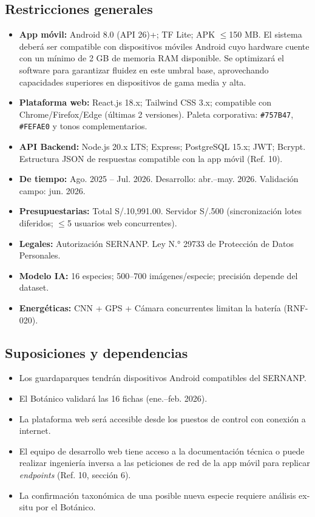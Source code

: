 \documentclass[12pt, a4paper]{article}
\begin{document}
\subsection{Restricciones generales}

\begin{itemize}
  \item \textbf{App m\'ovil:} Android 8.0 (API 26)+; TF Lite; APK $\leq$150 MB. El sistema deberá ser compatible con dispositivos móviles Android cuyo hardware cuente con un mínimo de 2 GB de memoria RAM disponible. Se optimizará el software para garantizar fluidez en este umbral base, aprovechando capacidades superiores en dispositivos de gama media y alta.
  \item \textbf{Plataforma web:} React.js 18.x; Tailwind CSS 3.x; compatible con Chrome/Firefox/Edge (\'ultimas 2 versiones). Paleta corporativa: \texttt{\#757B47}, \texttt{\#FEFAE0} y tonos complementarios.
  \item \textbf{API Backend:} Node.js 20.x LTS; Express; PostgreSQL 15.x; JWT; Bcrypt. Estructura JSON de respuestas compatible con la app m\'ovil (Ref. 10).
  \item \textbf{De tiempo:} Ago. 2025 -- Jul. 2026. Desarrollo: abr.--may. 2026. Validaci\'on campo: jun. 2026.
  \item \textbf{Presupuestarias:} Total S/.10,991.00. Servidor S/.500 (sincronizaci\'on lotes diferidos; $\leq$5 usuarios web concurrentes).
  \item \textbf{Legales:} Autorizaci\'on SERNANP. Ley N.° 29733 de Protecci\'on de Datos Personales.
  \item \textbf{Modelo IA:} 16 especies; 500--700 im\'agenes/especie; precisi\'on depende del dataset.
  \item \textbf{Energ\'eticas:} CNN + GPS + C\'amara concurrentes limitan la bater\'ia (RNF-020).
\end{itemize}

\subsection{Suposiciones y dependencias}

\begin{itemize}
  \item Los guardaparques tendr\'an dispositivos Android compatibles del SERNANP.
  \item El Bot\'anico validar\'a las 16 fichas (ene.--feb. 2026).
  \item La plataforma web ser\'a accesible desde los puestos de control con conexi\'on a internet.
  \item El equipo de desarrollo web tiene acceso a la documentaci\'on t\'ecnica o puede realizar ingenier\'ia inversa a las peticiones de red de la app m\'ovil para replicar \textit{endpoints} (Ref. 10, secci\'on 6).
  \item La confirmaci\'on taxon\'omica de una posible nueva especie requiere an\'alisis ex-situ por el Bot\'anico.
\end{itemize}
\end{document}

